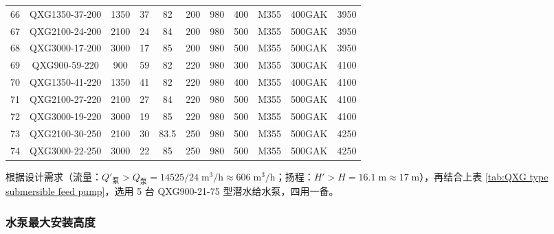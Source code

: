 \begin{table}[H]
{\begin{tabular}{ccccccccccc}
	66    & QXG1350-37-200 & 1350  & 37    & 82    & 200   & 980   & 400   & M355  & 400GAK & 3950 \\
	67    & QXG2100-24-200 & 2100  & 24    & 84    & 200   & 980   & 500   & M355  & 500GAK & 3950 \\
	68    & QXG3000-17-200 & 3000  & 17    & 85    & 200   & 980   & 500   & M355  & 500GAK & 3950 \\
	69    & QXG900-59-220 & 900   & 59    & 82    & 220   & 980   & 300   & M355  & 300GAK & 4100 \\
	70    & QXG1350-41-220 & 1350  & 41    & 82    & 220   & 980   & 400   & M355  & 400GAK & 4100 \\
	71    & QXG2100-27-220 & 2100  & 27    & 84    & 220   & 980   & 500   & M355  & 500GAK & 4100 \\
	72    & QXG3000-19-220 & 3000  & 19    & 85    & 220   & 980   & 500   & M355  & 500GAK & 4100 \\
	73    & QXG2100-30-250 & 2100  & 30    & 83.5  & 250   & 980   & 500   & M355  & 500GAK & 4250 \\
	74    & QXG3000-22-250 & 3000  & 22    & 85    & 250   & 980   & 500   & M355  & 500GAK & 4250 \\
	\bottomrule
	\end{tabular}}
\end{table}

根据设计需求（流量：$Q'_{\text{泵}}>Q_{\text{泵}}=14525/24 \;\text{m$^3$/h}\approx 606 \;\text{m$^3$/h}$；扬程：$H'>H=16.1 \;\text{m} \approx 17 \;\text{m}$），再结合上表 \ref{tab:QXG type submersible feed pump}，选用 5 台 QXG900-21-75 型潜水给水泵，四用一备。

\begin{table}[H]
	\centering
	\caption{QXG900-21-75 型潜水给水泵性能参数}
	\label{tab:QXG900-21-75 submersible feed pump performance parameters}
\end{table}


\subsubsection{水泵最大安装高度}

